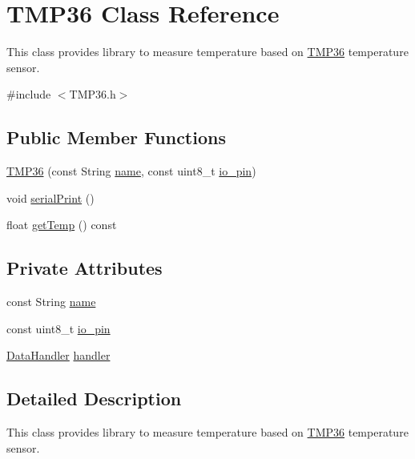 \hypertarget{class_t_m_p36}{}\section{T\+M\+P36 Class Reference}
\label{class_t_m_p36}


This class provides library to measure temperature based on \hyperlink{class_t_m_p36}{T\+M\+P36} temperature sensor.  




{\ttfamily \#include $<$T\+M\+P36.\+h$>$}

\subsection*{Public Member Functions}
\begin{DoxyCompactItemize}
\item 
\hyperlink{class_t_m_p36_a8973c298cb40084aed715a404423a214}{T\+M\+P36} (const String \hyperlink{class_t_m_p36_a515e4a254610bcc0581200f4c37f8309}{name}, const uint8\+\_\+t \hyperlink{class_t_m_p36_abbe6b02af520ddf052d7a23930174365}{io\+\_\+pin})
\item 
void \hyperlink{class_t_m_p36_a7e09f2c40c8cbcb80ab6333480277611}{serial\+Print} ()
\item 
float \hyperlink{class_t_m_p36_aeb884c6c65eb7fdaff09af9adbbb919c}{get\+Temp} () const
\end{DoxyCompactItemize}
\subsection*{Private Attributes}
\begin{DoxyCompactItemize}
\item 
const String \hyperlink{class_t_m_p36_a515e4a254610bcc0581200f4c37f8309}{name}
\item 
const uint8\+\_\+t \hyperlink{class_t_m_p36_abbe6b02af520ddf052d7a23930174365}{io\+\_\+pin}
\item 
\hyperlink{class_data_handler}{Data\+Handler} \hyperlink{class_t_m_p36_a452d439e40c40c24b41b49ae573e7b1e}{handler}
\end{DoxyCompactItemize}


\subsection{Detailed Description}
This class provides library to measure temperature based on \hyperlink{class_t_m_p36}{T\+M\+P36} temperature sensor. 

